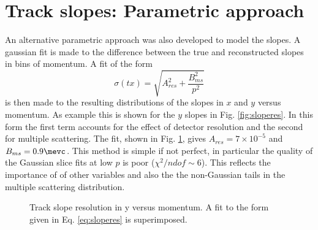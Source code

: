 \section{Track slopes: Parametric approach}
\label{sec:slopes}
%
An alternative parametric approach was also developed to model the slopes. A gaussian
fit is made to the difference between the true and reconstructed
slopes in bins of momentum. A  fit of the form
\begin{equation}
\sigma(tx) = \sqrt{A_{res}^2 + \frac{B_{ms}^2}{p^2}}
\label{eq:sloperes}
\end{equation}
 is then made to the resulting distributions of the slopes in $x$ and
 $y$ versus momentum. As example this is shown for the $y$ slopes in  Fig. \ref{fig:sloperes}. In this form the first term accounts for
the effect of detector resolution and the second for multiple
scattering. The fit, shown in Fig. \ref{fig:slopefitty},  gives $A_{res} = 7 \times 10^{-5}$ and $B_{ms} =
0.9 \mevc$. This method is simple if not perfect, in particular the quality of
the Gaussian slice fits at low $p$ is poor ($\chi^2/ndof
\sim 6$). This reflects the importance of of other variables and also
the the non-Gaussian tails in the multiple scattering distribution. 
\begin{figure}[htb!]
\begin{center}
\caption{\small Track slope resolution in y versus momentum. A fit to the
  form given in Eq. \ref{eq:sloperes} is superimposed.}
\label{fig:slopefitty}
\end{center}
\end{figure}
%

